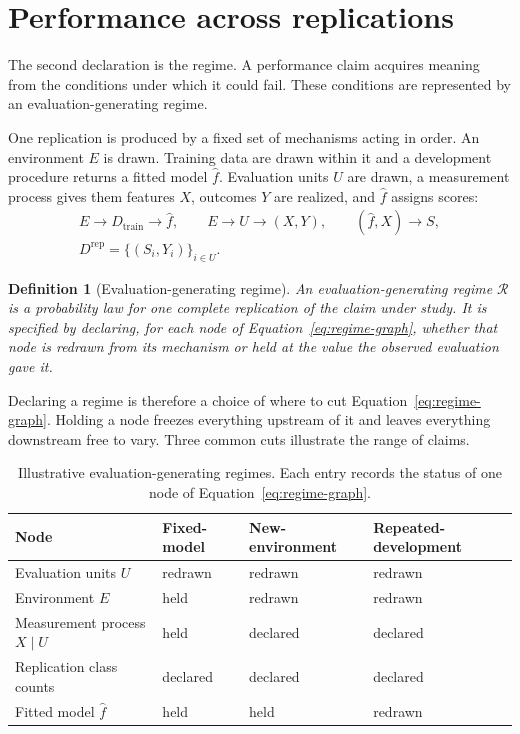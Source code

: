 \documentclass[11pt]{article}
\newcommand{\Regime}{\mathcal{R}}
\newtheorem{definition}{Definition}
\theoremstyle{remark}
\begin{document}
\section{Performance across replications}
\label{sec:regime}

The second declaration is the regime. A performance claim acquires meaning from the conditions under which it could fail. These conditions are represented by an evaluation-generating regime.

One replication is produced by a fixed set of mechanisms acting in order. An environment $E$ is drawn. Training data are drawn within it and a development procedure returns a fitted model $\widehat f$. Evaluation units $U$ are drawn, a measurement process gives them features $X$, outcomes $Y$ are realized, and $\widehat f$ assigns scores:
\begin{equation}
\begin{gathered}
E\longrightarrow D_{\mathrm{train}}\longrightarrow\widehat f,
\qquad
E\longrightarrow U\longrightarrow(X,Y),
\qquad
(\widehat f,X)\longrightarrow S,
\\
D^{\mathrm{rep}}=\{(S_i,Y_i)\}_{i\in U}.
\end{gathered}
\label{eq:regime-graph}
\end{equation}

\begin{definition}[Evaluation-generating regime]
An evaluation-generating regime $\Regime$ is a probability law for one complete replication of the claim under study. It is specified by declaring, for each node of Equation~\eqref{eq:regime-graph}, whether that node is redrawn from its mechanism or held at the value the observed evaluation gave it.
\end{definition}

Declaring a regime is therefore a choice of where to cut Equation~\eqref{eq:regime-graph}. Holding a node freezes everything upstream of it and leaves everything downstream free to vary. Three common cuts illustrate the range of claims.

\begin{table}[ht]
\centering
\caption{Illustrative evaluation-generating regimes. Each entry records the status of one node of Equation~\eqref{eq:regime-graph}.}
\label{tab:regimes}
\begin{tabularx}{\textwidth}{@{}>{\raggedright\arraybackslash}p{}XXX@{}}
\toprule
Node & Fixed-model & New-environment & Repeated-development \\
\midrule
Evaluation units $U$ & redrawn & redrawn & redrawn \\
Environment $E$ & held & redrawn & redrawn \\
Measurement process $X\mid U$ & held & declared & declared \\
Replication class counts & declared & declared & declared \\
Fitted model $\widehat f$ & held & held & redrawn \\
\bottomrule
\end{tabularx}
\end{table}
\end{document}
